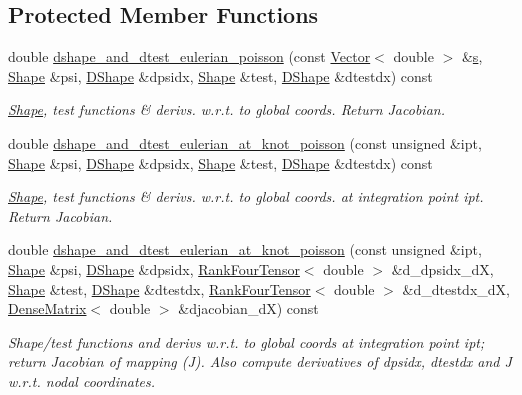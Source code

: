 \subsection*{Protected Member Functions}
\begin{DoxyCompactItemize}
\item 
double \hyperlink{classoomph_1_1QSpectralPoissonElement_ab2600e7f60d8a8c4b5c32109e9174e8f}{dshape\+\_\+and\+\_\+dtest\+\_\+eulerian\+\_\+poisson} (const \hyperlink{classoomph_1_1Vector}{Vector}$<$ double $>$ \&\hyperlink{cfortran_8h_ab7123126e4885ef647dd9c6e3807a21c}{s}, \hyperlink{classoomph_1_1Shape}{Shape} \&psi, \hyperlink{classoomph_1_1DShape}{D\+Shape} \&dpsidx, \hyperlink{classoomph_1_1Shape}{Shape} \&test, \hyperlink{classoomph_1_1DShape}{D\+Shape} \&dtestdx) const
\begin{DoxyCompactList}\small\item\em \hyperlink{classoomph_1_1Shape}{Shape}, test functions \& derivs. w.\+r.\+t. to global coords. Return Jacobian. \end{DoxyCompactList}\item 
double \hyperlink{classoomph_1_1QSpectralPoissonElement_a294aee49389f189dc34724737aa26efe}{dshape\+\_\+and\+\_\+dtest\+\_\+eulerian\+\_\+at\+\_\+knot\+\_\+poisson} (const unsigned \&ipt, \hyperlink{classoomph_1_1Shape}{Shape} \&psi, \hyperlink{classoomph_1_1DShape}{D\+Shape} \&dpsidx, \hyperlink{classoomph_1_1Shape}{Shape} \&test, \hyperlink{classoomph_1_1DShape}{D\+Shape} \&dtestdx) const
\begin{DoxyCompactList}\small\item\em \hyperlink{classoomph_1_1Shape}{Shape}, test functions \& derivs. w.\+r.\+t. to global coords. at integration point ipt. Return Jacobian. \end{DoxyCompactList}\item 
double \hyperlink{classoomph_1_1QSpectralPoissonElement_a20e5c72a2d391708edb7dd2e53666810}{dshape\+\_\+and\+\_\+dtest\+\_\+eulerian\+\_\+at\+\_\+knot\+\_\+poisson} (const unsigned \&ipt, \hyperlink{classoomph_1_1Shape}{Shape} \&psi, \hyperlink{classoomph_1_1DShape}{D\+Shape} \&dpsidx, \hyperlink{classoomph_1_1RankFourTensor}{Rank\+Four\+Tensor}$<$ double $>$ \&d\+\_\+dpsidx\+\_\+dX, \hyperlink{classoomph_1_1Shape}{Shape} \&test, \hyperlink{classoomph_1_1DShape}{D\+Shape} \&dtestdx, \hyperlink{classoomph_1_1RankFourTensor}{Rank\+Four\+Tensor}$<$ double $>$ \&d\+\_\+dtestdx\+\_\+dX, \hyperlink{classoomph_1_1DenseMatrix}{Dense\+Matrix}$<$ double $>$ \&djacobian\+\_\+dX) const
\begin{DoxyCompactList}\small\item\em Shape/test functions and derivs w.\+r.\+t. to global coords at integration point ipt; return Jacobian of mapping (J). Also compute derivatives of dpsidx, dtestdx and J w.\+r.\+t. nodal coordinates. \end{DoxyCompactList}\end{DoxyCompactItemize}

